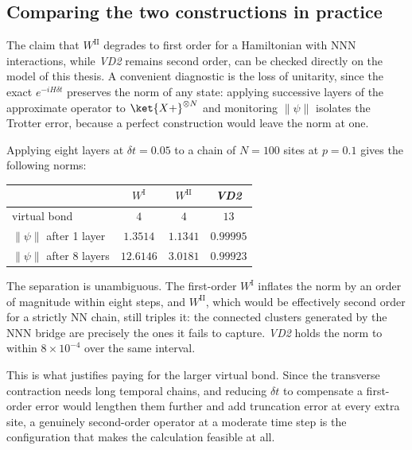\subsection{Comparing the two constructions in practice}
\label{app:mpo:comparison}

The claim that $W^{\mathrm{II}}$ degrades to first order for a Hamiltonian with \ac{NNN} interactions, while \textit{VD2} remains second order, can be checked directly on the model of this thesis. A convenient diagnostic is the loss of unitarity, since the exact $e^{-iH\delta t}$ preserves the norm of any state: applying successive layers of the approximate operator to $\ket{X+}^{\otimes N}$ and monitoring $\lVert\psi\rVert$ isolates the Trotter error, because a perfect construction would leave the norm at one.

Applying eight layers at $\delta t=0.05$ to a chain of $N=100$ sites at $p=0.1$ gives the following norms:

\begin{center}
\begin{tabular}{lccc}
\hline
 & $W^{\mathrm{I}}$ & $W^{\mathrm{II}}$ & \textit{VD2} \\
\hline
virtual bond & $4$ & $4$ & $13$ \\
$\lVert\psi\rVert$ after 1 layer & $1.3514$ & $1.1341$ & $0.99995$ \\
$\lVert\psi\rVert$ after 8 layers & $12.6146$ & $3.0181$ & $0.99923$ \\
\hline
\end{tabular}
\end{center}

The separation is unambiguous. The first-order $W^{\mathrm{I}}$ inflates the norm by an order of magnitude within eight steps, and $W^{\mathrm{II}}$, which would be effectively second order for a strictly \ac{NN} chain, still triples it: the connected clusters generated by the \ac{NNN} bridge are precisely the ones it fails to capture. \textit{VD2} holds the norm to within $8\times10^{-4}$ over the same interval.

This is what justifies paying for the larger virtual bond. Since the transverse contraction needs long temporal chains, and reducing $\delta t$ to compensate a first-order error would lengthen them further and add truncation error at every extra site, a genuinely second-order operator at a moderate time step is the configuration that makes the calculation feasible at all.


